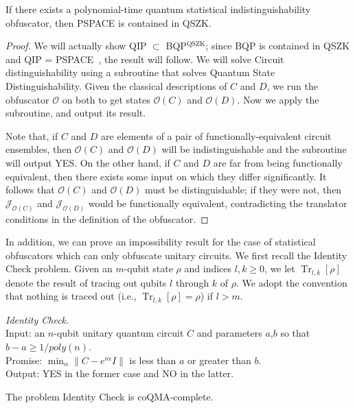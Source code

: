 \documentclass[envcountsame]{llncs}
\DeclareMathOperator{\tr}{Tr}
\numberwithin{equation}{section}
\newcommand{\algo}{\mathcal}
\begin{document}
\begin{theorem}
If there exists a polynomial-time quantum statistical indistinguishability obfuscator, then PSPACE is contained in QSZK.
\end{theorem}
\begin{proof}
We will actually show QIP $\subset$ BQP$^{\text{QSZK}}$; since BQP is contained in QSZK and QIP = PSPACE~\cite{JJUW10}, the result will follow. We will solve \textsf{Circuit distinguishability} using a subroutine that solves \textsf{Quantum State Distinguishability}. Given the classical descriptions of $C$ and $D$, we run the obfuscator $\algo O$ on both to get states $\algo O(C)$ and $\algo O(D)$. Now we apply the subroutine, and output its result.

Note that, if $C$ and $D$ are elements of a pair of functionally-equivalent circuit ensembles, then $\algo O(C)$ and $\algo O(D)$ will be indistinguishable and the subroutine will output YES. On the other hand, if $C$ and $D$ are far from being functionally equivalent, then there exists some input on which they differ significantly. It follows that $\algo O(C)$ and $\algo O(D)$ must be distinguishable; if they were not, then $\algo J_{\algo O(C)}$ and $\algo J_{\algo O(D)}$ would be functionally equivalent, contradicting the translator conditions in the definition of the obfuscator.
\end{proof}

In addition, we can prove an impossibility result for the case of statistical obfuscators which can only obfuscate unitary circuits. We first recall the \textsf{Identity Check} problem. Given an $m$-qubit state $\rho$ and indices $l, k \geq 0$, we let $\tr_{l,k} [\rho]$ denote the result of tracing out qubits $l$ through $k$ of $\rho$. We adopt the convention that nothing is traced out (i.e., $\tr_{l,k}[\rho] = \rho$) if $l > m$.

\begin{problem} \emph{\textsf{Identity Check}}.\\
\indent Input: an $n$-qubit unitary quantum circuit $C$ and parameters $a$,$b$ so that $b-a\geq 1/poly(n)$. \\
\indent Promise: $\min_\alpha \| C - e^{i \alpha} I \|$ is less than $a$ or greater than $b$.\\
\indent Output: YES in the former case and NO in the latter.
\end{problem}

\begin{theorem}\label{thm:ID}
\emph{\cite{JWB03}} The problem Identity Check is coQMA-complete. 
\end{theorem}
\end{document}
